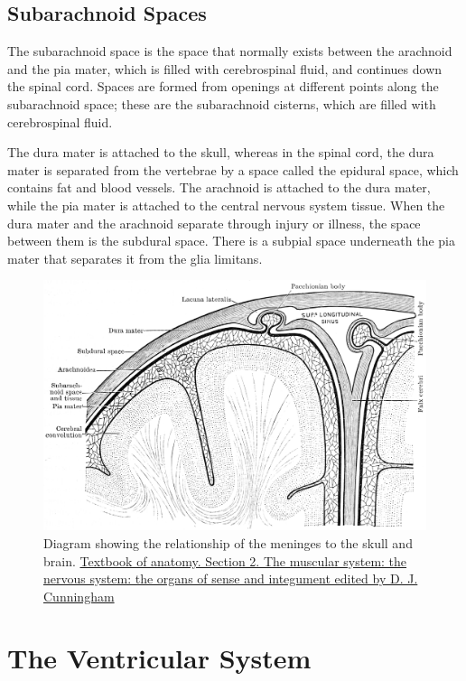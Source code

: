\hypertarget{subarachnoid-spaces}{%
\subsection{Subarachnoid Spaces}\label{subarachnoid-spaces}}

The subarachnoid space is the space that normally exists between the arachnoid and the pia mater, which is filled with cerebrospinal fluid, and continues down the spinal cord. Spaces are formed from openings at different points along the subarachnoid space; these are the subarachnoid cisterns, which are filled with cerebrospinal fluid.

The dura mater is attached to the skull, whereas in the spinal cord, the dura mater is separated from the vertebrae by a space called the epidural space, which contains fat and blood vessels. The arachnoid is attached to the dura mater, while the pia mater is attached to the central nervous system tissue. When the dura mater and the arachnoid separate through injury or illness, the space between them is the subdural space. There is a subpial space underneath the pia mater that separates it from the glia limitans.



\begin{figure}

{\centering \includegraphics[width=0.7\linewidth]{./figures/cns/meninges} 

}

\caption{Diagram showing the relationship of the meninges to the skull and brain. \href{https://wellcomelibrary.org/item/b21271070}{Textbook of anatomy. Section 2. The muscular system: the nervous system: the organs of sense and integument edited by D. J. Cunningham}}\label{fig:meninges}
\end{figure}

\hypertarget{the-ventricular-system}{%
\section{The Ventricular System}\label{the-ventricular-system}}

